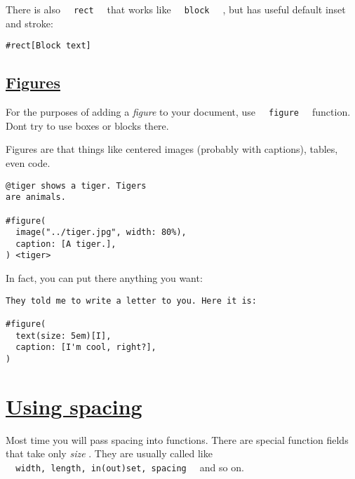 There is also \texttt{\ }{\texttt{\ rect\ }}\texttt{\ } that works like
\texttt{\ }{\texttt{\ block\ }}\texttt{\ } , but has useful default
inset and stroke:

\begin{verbatim}
#rect[Block text]
\end{verbatim}

\pandocbounded{}

\subsection{\texorpdfstring{\hyperref[figures]{Figures}}{Figures}}\label{figures}

For the purposes of adding a \emph{figure} to your document, use
\texttt{\ }{\texttt{\ figure\ }}\texttt{\ } function.
Don\textquotesingle t try to use boxes or blocks there.

Figures are that things like centered images (probably with captions),
tables, even code.

\begin{verbatim}
@tiger shows a tiger. Tigers
are animals.

#figure(
  image("../tiger.jpg", width: 80%),
  caption: [A tiger.],
) <tiger>
\end{verbatim}

\pandocbounded{}

In fact, you can put there anything you want:

\begin{verbatim}
They told me to write a letter to you. Here it is:

#figure(
  text(size: 5em)[I],
  caption: [I'm cool, right?],
)
\end{verbatim}

\pandocbounded{}

\section{\texorpdfstring{\hyperref[using-spacing]{Using
spacing}}{Using spacing}}\label{using-spacing}

Most time you will pass spacing into functions. There are special
function fields that take only \emph{size} . They are usually called
like
\texttt{\ }{\texttt{\ width,\ length,\ in(out)set,\ spacing\ }}\texttt{\ }
and so on.

